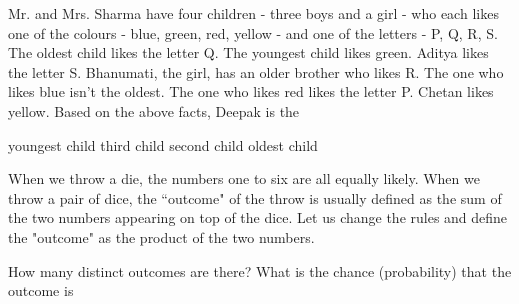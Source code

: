 \documentclass[12pt]{exam}
\begin{document}
\begin{questions}

\question Mr. and Mrs. Sharma have four children - three boys and a girl - who each likes one of the colours - blue, green, red, yellow - and one of the letters - P, Q, R, S. The oldest child likes the letter Q. The youngest child likes green. Aditya likes the letter S. Bhanumati, the girl, has an older brother who likes R. The one who likes blue isn't the oldest. The one who likes red likes the letter P. Chetan likes yellow. Based on the above facts, Deepak is the
\begin{choices}
    \choice youngest child
    \choice third child
    \choice second child
    \choice oldest child
\end{choices}

\question When we throw a die, the numbers one to six are all equally likely. When we throw a pair of dice, the ``outcome" of the throw is usually defined as the sum of the two numbers appearing on top of the dice. Let us change the rules and define the "outcome" as the product of the two numbers.

How many distinct outcomes are there? What is the chance (probability) that the outcome is
\end{questions}
\end{document}
